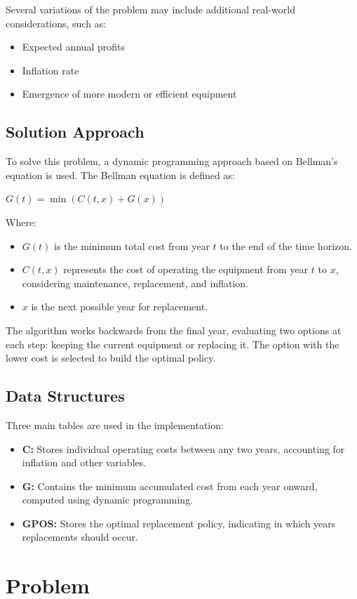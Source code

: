 \documentclass{article}
\begin{document}
Several variations of the problem may include additional real-world considerations, such as:
\begin{itemize}
  \item Expected annual profits
  \item Inflation rate
  \item Emergence of more modern or efficient equipment
\end{itemize}

\subsection{Solution Approach}
To solve this problem, a dynamic programming approach based on Bellman's equation is used. The Bellman equation is defined as:
\begin{center}
$G(t) = \min(C(t, x) + G(x))$
\end{center}
Where:
\begin{itemize}
  \item $G(t)$ is the minimum total cost from year $t$ to the end of the time horizon.
  \item $C(t, x)$ represents the cost of operating the equipment from year $t$ to $x$, considering maintenance, replacement, and inflation.
  \item $x$ is the next possible year for replacement.
\end{itemize}
The algorithm works backwards from the final year, evaluating two options at each step: keeping the current equipment or replacing it. The option with the lower cost is selected to build the optimal policy.

\subsection{Data Structures}
Three main tables are used in the implementation:
\begin{itemize}
  \item \textbf{C:} Stores individual operating costs between any two years, accounting for inflation and other variables.
  \item \textbf{G:} Contains the minimum accumulated cost from each year onward, computed using dynamic programming.
  \item \textbf{GPOS:} Stores the optimal replacement policy, indicating in which years replacements should occur.
\end{itemize}

\section{Problem}
\end{document}
